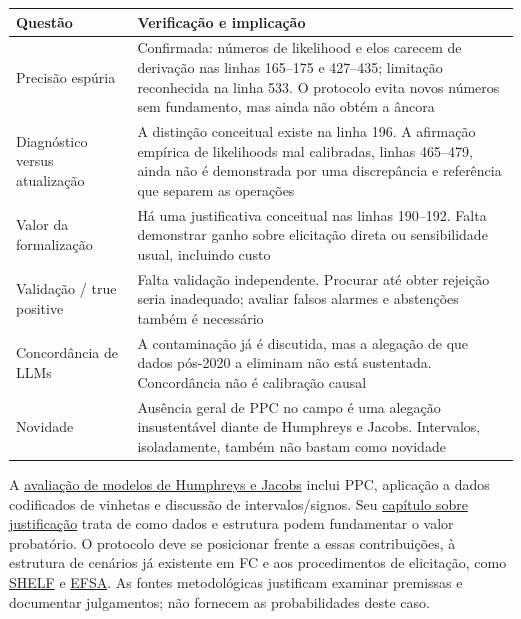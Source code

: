 \documentclass[
  brazilian,
  11pt,
  a4paper,
]{article}
\begin{document}
\begin{longtable}[]{@{}
  >{\raggedright\arraybackslash}p{}
  >{\raggedright\arraybackslash}p{}@{}}
\toprule\noalign{}
\begin{minipage}[b]{\linewidth}\raggedright
Questão
\end{minipage} & \begin{minipage}[b]{\linewidth}\raggedright
Verificação e implicação
\end{minipage} \\
\midrule\noalign{}
\endhead
\bottomrule\noalign{}
\endlastfoot
Precisão espúria & Confirmada: números de likelihood e elos carecem de
derivação nas linhas 165--175 e 427--435; limitação reconhecida na linha
533. O protocolo evita novos números sem fundamento, mas ainda não obtém
a âncora \\
Diagnóstico versus atualização & A distinção conceitual existe na linha
196. A afirmação empírica de likelihoods mal calibradas, linhas
465--479, ainda não é demonstrada por uma discrepância e referência que
separem as operações \\
Valor da formalização & Há uma justificativa conceitual nas linhas
190--192. Falta demonstrar ganho sobre elicitação direta ou
sensibilidade usual, incluindo custo \\
Validação / true positive & Falta validação independente. Procurar até
obter rejeição seria inadequado; avaliar falsos alarmes e abstenções
também é necessário \\
Concordância de LLMs & A contaminação já é discutida, mas a alegação de
que dados pós-2020 a eliminam não está sustentada. Concordância não é
calibração causal \\
Novidade & Ausência geral de PPC no campo é uma alegação insustentável
diante de Humphreys e Jacobs. Intervalos, isoladamente, também não
bastam como novidade \\
\end{longtable}

A
\href{https://integrated-inferences.github.io/book/16-evaluating-models.html}{avaliação
de modelos de Humphreys e Jacobs} inclui PPC, aplicação a dados
codificados de vinhetas e discussão de intervalos/signos. Seu
\href{https://integrated-inferences.github.io/book/15-justifying-models.html}{capítulo
sobre justificação} trata de como dados e estrutura podem fundamentar o
valor probatório. O protocolo deve se posicionar frente a essas
contribuições, à estrutura de cenários já existente em FC e aos
procedimentos de elicitação, como
\href{https://shelf.sites.sheffield.ac.uk/}{SHELF} e
\href{https://www.efsa.europa.eu/en/efsajournal/pub/3734}{EFSA}. As
fontes metodológicas justificam examinar premissas e documentar
julgamentos; não fornecem as probabilidades deste caso.
\end{document}
